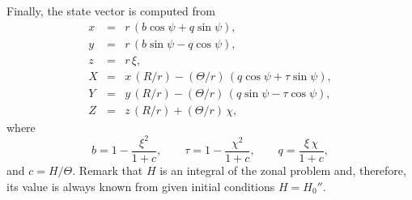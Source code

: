\documentclass{article}
\begin{document}
Finally, the state vector is computed from
\begin{eqnarray*} \label{ns2x}
x &=& r\,(b\cos\psi+q\sin\psi), \\ \label{ns2y}
y &=& r\,(b\sin\psi-q\cos\psi), \\
z &=& r\,\xi, \\
X &=& x\,(R/r) %
 - ({\Theta}/{r})\,(q\cos\psi+\tau\sin\psi), \\ \label{ns2Y}
Y &=& y\,(R/r) %
 - ({\Theta}/{r})\,(q\sin\psi-\tau\cos\psi), \\  \label{ns2zz}
Z &=& z\,(R/r)+(\Theta/r)\,\chi,
\end{eqnarray*}
where
\[%
b=1-\frac{\xi^2}{1+c}, \qquad
\tau=1 - \frac{\chi^2}{1 + c}, \qquad
q=\frac{\xi\,\chi}{1+c},
\]%
and $c=H/\Theta$. Remark that $H$ is an integral of the zonal problem and, therefore, its value is always known from given initial conditions $H=H_0''$.









\end{document}
